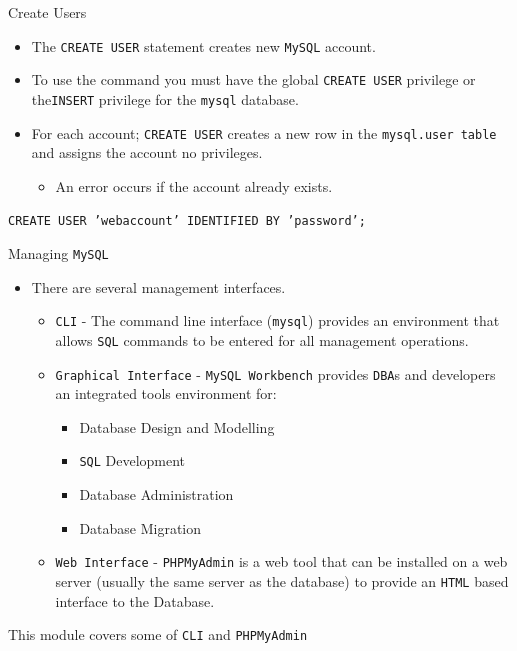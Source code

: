 \documentclass[xcolor=table]{beamer}
\begin{document}
\begin{frame}{Create Users}
  \begin{itemize}
    \item The \texttt{CREATE USER} statement creates new \texttt{MySQL} account. 
    \item To use the command you must have the global \texttt{CREATE USER} privilege or the\texttt{INSERT} privilege for the \texttt{mysql} database. 
    \item For each account; \texttt{CREATE USER} creates a new row in the \texttt{mysql.user table} and assigns the account no privileges. 
    \begin{itemize}
      \item An error occurs if the account already exists.
    \end{itemize}
  \end{itemize}
  \begin{tcolorbox}
    \small\texttt{CREATE USER 'webaccount' IDENTIFIED BY 'password';}
  \end{tcolorbox}
\end{frame}

\begin{frame}{Managing \texttt{MySQL}}
  \begin{itemize}
    \item There are several management interfaces.
    \begin{itemize}
      \item \texttt{CLI} - The command line interface (\texttt{mysql}) provides an environment that allows \texttt{SQL} commands to be entered for all management operations.
      \item \texttt{Graphical Interface} - \texttt{MySQL Workbench} provides \texttt{DBA}s and developers an integrated tools environment for:  
        \begin{itemize}
          \item Database Design and Modelling
          \item \texttt{SQL} Development
          \item Database Administration
          \item Database Migration
        \end{itemize}
      \item \texttt{Web Interface} - \texttt{PHPMyAdmin} is a web tool that can be installed on a web server (usually the same server as the database) to provide an \texttt{HTML} based interface to the Database.
    \end{itemize}
  \end{itemize}
  \begin{tcolorbox}
    \begin{center}
      \small This module covers some of \texttt{CLI} and \texttt{PHPMyAdmin}      
    \end{center}
  \end{tcolorbox}
\end{frame}
\end{document}
